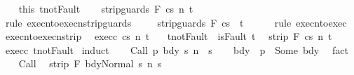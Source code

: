 \begin{isabellebody}
\ \ \isamarkupfalse%
\ this\ t{\isacharunderscore}not{\isacharunderscore}Fault\isanewline
\ \ \isamarkupfalse%
\ {\isachardoublequoteopen}{\isasymGamma}{\isasymturnstile}{\isasymlangle}strip{\isacharunderscore}guards\ F\ c{\isacharcomma}s{\isasymrangle}\ {\isacharequal}n{\isasymRightarrow}\ t{\isachardoublequoteclose}\isanewline
\ \ \ \ \isamarkupfalse%
\ {\isacharparenleft}rule\ execn{\isacharunderscore}to{\isacharunderscore}execn{\isacharunderscore}strip{\isacharunderscore}guards{\isacharprime}\ {\isacharparenright}\isanewline
\ \ \isamarkupfalse%
\ {\isachardoublequoteopen}{\isasymGamma}{\isasymturnstile}{\isasymlangle}strip{\isacharunderscore}guards\ F\ c{\isacharcomma}s{\isasymrangle}\ {\isasymRightarrow}\ t{\isachardoublequoteclose}\isanewline
\ \ \ \ \isamarkupfalse%
\ {\isacharparenleft}rule\ execn{\isacharunderscore}to{\isacharunderscore}exec{\isacharparenright}\isanewline
{}\isamarkupfalse%
%
\endisatagproof
{\isafoldproof}%
%
\isadelimproof
\isanewline
%
\endisadelimproof
\isanewline
{}\isamarkupfalse%
\ execn{\isacharunderscore}to{\isacharunderscore}execn{\isacharunderscore}strip{\isacharcolon}\isanewline
\ \ exec{\isacharunderscore}c{\isacharcolon}\ {\isachardoublequoteopen}{\isasymGamma}{\isasymturnstile}{\isasymlangle}c{\isacharcomma}s{\isasymrangle}\ {\isacharequal}n{\isasymRightarrow}\ t{\isachardoublequoteclose}\ \isanewline
\ \ t{\isacharunderscore}not{\isacharunderscore}Fault{\isacharcolon}\ {\isachardoublequoteopen}{\isasymnot}\ isFault\ t{\isachardoublequoteclose}\isanewline
\ \ {\isachardoublequoteopen}strip\ F\ {\isasymGamma}{\isasymturnstile}{\isasymlangle}c{\isacharcomma}s{\isasymrangle}\ {\isacharequal}n{\isasymRightarrow}\ t{\isachardoublequoteclose}\isanewline
%
\isadelimproof
%
\endisadelimproof
%
\isatagproof
{}\isamarkupfalse%
\ exec{\isacharunderscore}c\ t{\isacharunderscore}not{\isacharunderscore}Fault\isanewline
{}\isamarkupfalse%
\ {\isacharparenleft}induct{\isacharparenright}\isanewline
\ \ \isamarkupfalse%
\ {\isacharparenleft}Call\ p\ bdy\ s\ n\ \ s{\isacharprime}{\isacharparenright}\isanewline
\ \ \isamarkupfalse%
\ bdy{\isacharcolon}\ {\isachardoublequoteopen}{\isasymGamma}\ p\ {\isacharequal}\ Some\ bdy{\isachardoublequoteclose}\ \isamarkupfalse%
\ fact\isanewline
\ \ \isamarkupfalse%
\ Call\ \isamarkupfalse%
\ {\isachardoublequoteopen}strip\ F\ {\isasymGamma}{\isasymturnstile}{\isasymlangle}bdy{\isacharcomma}Normal\ s{\isasymrangle}\ {\isacharequal}n{\isasymRightarrow}\ s{\isacharprime}{\isachardoublequoteclose}\isanewline

\end{isabellebody}
